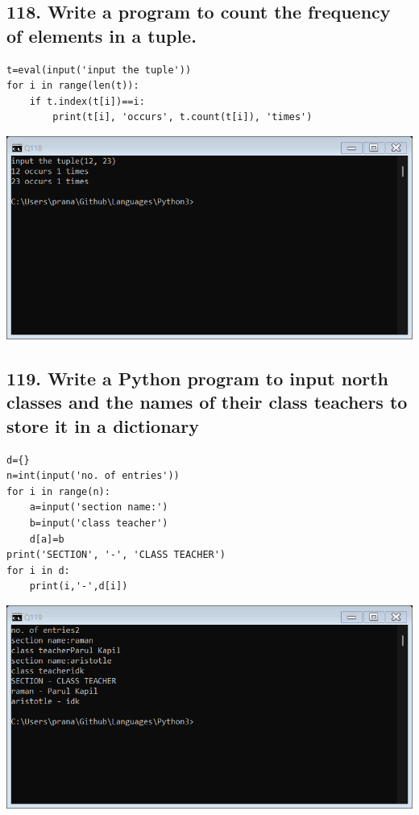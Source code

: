 \documentclass[12pt]{article}
\begin{document}
\subsection*{118. Write a program to count the frequency of elements in a tuple.}
\begin{verbatim}
t=eval(input('input the tuple'))
for i in range(len(t)):
 	if t.index(t[i])==i:
 		print(t[i], 'occurs', t.count(t[i]), 'times')
\end{verbatim}
\includegraphics[width=\linewidth]{images/118.png}

\subsection*{119. Write a Python program to input north classes and the names of their class teachers to store it in a dictionary}
\begin{verbatim}
d={}
n=int(input('no. of entries'))
for i in range(n):
    a=input('section name:')
    b=input('class teacher')
    d[a]=b
print('SECTION', '-', 'CLASS TEACHER')
for i in d:
    print(i,'-',d[i])
\end{verbatim}
\includegraphics[width=\linewidth]{images/119.png}
\end{document}

